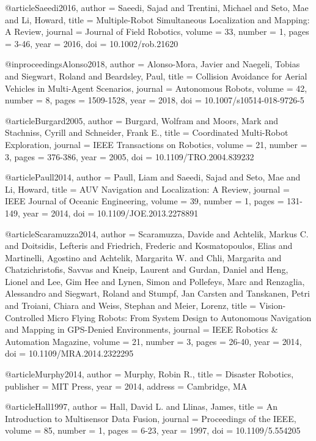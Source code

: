 @article{Saeedi2016,
  author = {Saeedi, Sajad and Trentini, Michael and Seto, Mae and Li, Howard},
  title = {Multiple-Robot Simultaneous Localization and Mapping: A Review},
  journal = {Journal of Field Robotics},
  volume = {33},
  number = {1},
  pages = {3-46},
  year = {2016},
  doi = {10.1002/rob.21620}
}

@inproceedings{Alonso2018,
  author = {Alonso-Mora, Javier and Naegeli, Tobias and Siegwart, Roland and Beardsley, Paul},
  title = {Collision Avoidance for Aerial Vehicles in Multi-Agent Scenarios},
  journal = {Autonomous Robots},
  volume = {42},
  number = {8},
  pages = {1509-1528},
  year = {2018},
  doi = {10.1007/s10514-018-9726-5}
}

@article{Burgard2005,
  author = {Burgard, Wolfram and Moors, Mark and Stachniss, Cyrill and Schneider, Frank E.},
  title = {Coordinated Multi-Robot Exploration},
  journal = {IEEE Transactions on Robotics},
  volume = {21},
  number = {3},
  pages = {376-386},
  year = {2005},
  doi = {10.1109/TRO.2004.839232}
}

@article{Paull2014,
  author = {Paull, Liam and Saeedi, Sajad and Seto, Mae and Li, Howard},
  title = {AUV Navigation and Localization: A Review},
  journal = {IEEE Journal of Oceanic Engineering},
  volume = {39},
  number = {1},
  pages = {131-149},
  year = {2014},
  doi = {10.1109/JOE.2013.2278891}
}

@article{Scaramuzza2014,
  author = {Scaramuzza, Davide and Achtelik, Markus C. and Doitsidis, Lefteris and Friedrich, Frederic and Kosmatopoulos, Elias and Martinelli, Agostino and Achtelik, Margarita W. and Chli, Margarita and Chatzichristofis, Savvas and Kneip, Laurent and Gurdan, Daniel and Heng, Lionel and Lee, Gim Hee and Lynen, Simon and Pollefeys, Marc and Renzaglia, Alessandro and Siegwart, Roland and Stumpf, Jan Carsten and Tanskanen, Petri and Troiani, Chiara and Weiss, Stephan and Meier, Lorenz},
  title = {Vision-Controlled Micro Flying Robots: From System Design to Autonomous Navigation and Mapping in GPS-Denied Environments},
  journal = {IEEE Robotics \& Automation Magazine},
  volume = {21},
  number = {3},
  pages = {26-40},
  year = {2014},
  doi = {10.1109/MRA.2014.2322295}
}

@article{Murphy2014,
  author = {Murphy, Robin R.},
  title = {Disaster Robotics},
  publisher = {MIT Press},
  year = {2014},
  address = {Cambridge, MA}
}

@article{Hall1997,
  author = {Hall, David L. and Llinas, James},
  title = {An Introduction to Multisensor Data Fusion},
  journal = {Proceedings of the IEEE},
  volume = {85},
  number = {1},
  pages = {6-23},
  year = {1997},
  doi = {10.1109/5.554205}
}

